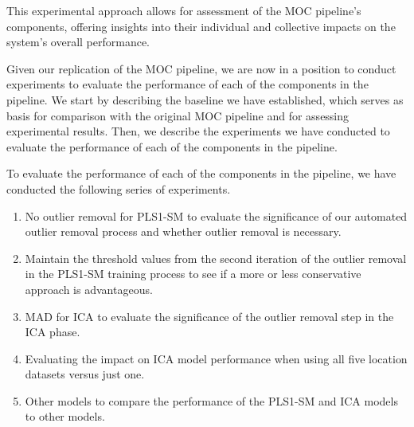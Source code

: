 This experimental approach allows for assessment of the MOC pipeline's components, offering insights into their individual and collective impacts on the system's overall performance.





Given our replication of the MOC pipeline, we are now in a position to conduct experiments to evaluate the performance of each of the components in the pipeline.
We start by describing the baseline we have established, which serves as basis for comparison with the original MOC pipeline and for assessing experimental results.
Then, we describe the experiments we have conducted to evaluate the performance of each of the components in the pipeline.

To evaluate the performance of each of the components in the pipeline, we have conducted the following series of experiments.

\begin{enumerate}
	\item\label{enum:experiment1} No outlier removal for PLS1-SM to evaluate the significance of our automated outlier removal process and whether outlier removal is necessary.
	\item\label{enum:experiment2} Maintain the threshold values from the second iteration of the outlier removal in the PLS1-SM training process to see if a more or less conservative approach is advantageous.
	\item\label{enum:experiment3} MAD for ICA to evaluate the significance of the outlier removal step in the ICA phase.
	\item\label{enum:experiment4} Evaluating the impact on ICA model performance when using all five location datasets versus just one.
	\item\label{enum:experiment5} Other models to compare the performance of the PLS1-SM and ICA models to other models.
\end{enumerate}

